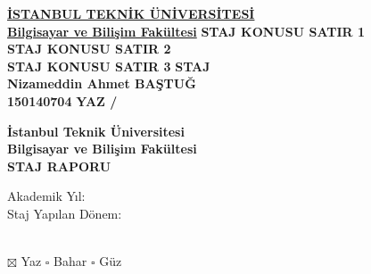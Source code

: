 \documentclass[12pt]{article}
\newcommand{\isim}{Nizameddin Ahmet BAŞTUĞ}
\newcommand{\id}{150140704}
\begin{document}

\begin{titlepage}
  \centering
  \underline{\bfseries İSTANBUL TEKNİK ÜNİVERSİTESİ} \\
  \underline{\bfseries Bilgisayar ve Bilişim Fakültesi}
  \vfill
      {\bfseries STAJ KONUSU SATIR 1} \\
      {\bfseries STAJ KONUSU SATIR 2} \\
      {\bfseries STAJ KONUSU SATIR 3}
      \vfill
          {\Large\bfseries STAJ} \\
          {\bfseries \isim} \\
          {\bfseries \id}
      \vfill
  {\bfseries YAZ / \the\year}
  
\end{titlepage}

{\centering
{\bfseries İstanbul Teknik Üniversitesi} \\
{\bfseries Bilgisayar ve Bilişim Fakültesi} \\
{\bfseries STAJ RAPORU} \\[1\baselineskip] \par}
\begin{minipage}[t]{.3\textwidth}
  \begin{flushright}
    Akademik Yıl: \\
    Staj Yapılan Dönem:
  \end{flushright}
\end{minipage}%
\hspace{0.5cm}
\begin{minipage}[t]{.7\textwidth}
  \the\year\\
 $\boxtimes$ Yaz  $\square$ Bahar  $\square$ Güz \\ 
\end{minipage}
\end{document}
